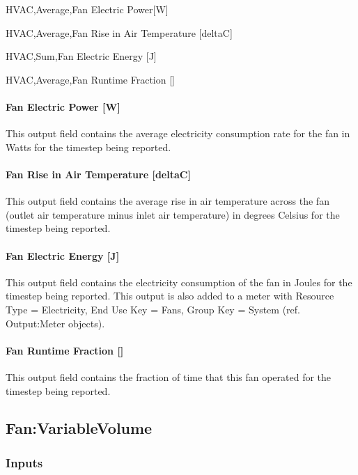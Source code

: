 HVAC,Average,Fan Electric Power{[}W{]}

HVAC,Average,Fan Rise in Air Temperature {[}deltaC{]}

HVAC,Sum,Fan Electric Energy {[}J{]}

HVAC,Average,Fan Runtime Fraction {[]}

\paragraph{Fan Electric Power {[}W{]}}\label{fan-electric-power-w-1}

This output field contains the average electricity consumption rate for the fan in Watts for the timestep being reported.

\paragraph{Fan Rise in Air Temperature {[}deltaC{]}}\label{fan-rise-in-air-temperature-deltac-1}

This output field contains the average rise in air temperature across the fan (outlet air temperature minus inlet air temperature) in degrees Celsius for the timestep being reported.

\paragraph{Fan Electric Energy {[}J{]}}\label{fan-electric-energy-j-1}

This output field contains the electricity consumption of the fan in Joules for the timestep being reported. This output is also added to a meter with Resource Type = Electricity, End Use Key = Fans, Group Key = System (ref. Output:Meter objects).

\paragraph{Fan Runtime Fraction {[]}}\label{fan-runtime-fraction}

This output field contains the fraction of time that this fan operated for the timestep being reported.

\subsection{Fan:VariableVolume}\label{fanvariablevolume}

\subsubsection{Inputs}\label{inputs-2-016}

